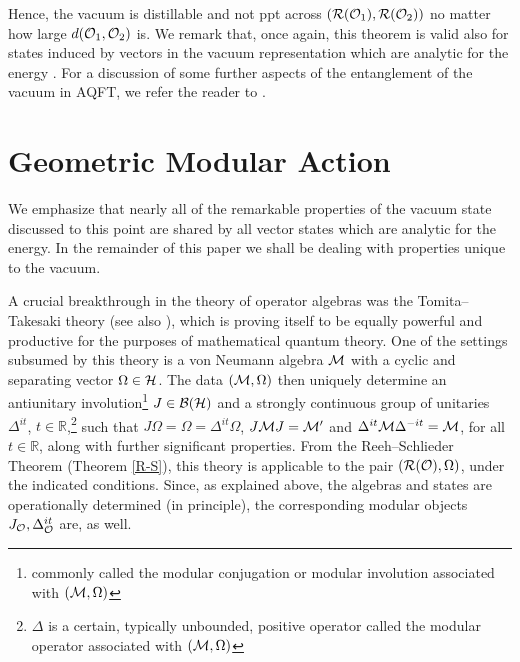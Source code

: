 \documentclass[12pt]{article}
\def\nind{\noindent}
\def\Bs{{\cal B}}
\def\Hs{{\cal H}}
\def\Ms{{\cal M}}
\def\Os{{\cal O}}
\def\Rs{{\cal R}}
\def\pairf{{(\Rs(\Os_1),\Rs(\Os_2))}}
\def\nind{\noindent}
\def\RR{{\mathbb R}}
\begin{document}
\nind Hence, the vacuum is distillable and not ppt across $\pairf$ no
matter how large $d(\Os_1,\Os_2)$ is. We remark that, once again, this
theorem is valid also for states induced by vectors in the vacuum 
representation which are analytic for the energy \cite{VeWe}. For a 
discussion of some further aspects of the entanglement of the vacuum in AQFT, 
we refer the reader to \cite{ClHa}. 


\section{Geometric Modular Action} \label{cgmasec}

     We emphasize that nearly all of the remarkable properties of the
vacuum state discussed to this point are shared by all vector states
which are analytic for the energy. In the remainder of this paper we shall
be dealing with properties unique to the vacuum.

     A crucial breakthrough in the theory of operator algebras was the
Tomita--Takesaki theory \cite{Takm} (see also \cite{KaRi2,Tak2}), which
is proving itself to be equally powerful and productive for the
purposes of mathematical quantum theory.
One of the settings subsumed by this theory is a von Neumann algebra
$\Ms$ with a cyclic and separating vector $\Omega \in \Hs$. The
data $(\Ms,\Omega)$ then uniquely determine an antiunitary 
involution\footnote{commonly called the modular conjugation or 
modular involution associated with $(\Ms,\Omega)$}
$J \in \Bs(\Hs)$ and a strongly continuous group of unitaries
$\Delta^{it}$, $t \in \RR$,\footnote{$\Delta$ is a certain, typically 
unbounded, positive operator called the modular operator associated 
with $(\Ms,\Omega)$} 
such that $J \Omega = \Omega = \Delta^{it} \Omega$, $J \Ms J = \Ms'$ and
$ \Delta^{it} \Ms \Delta^{-it} = \Ms$, for all $t \in \RR$,
along with further significant properties. From the Reeh--Schlieder
Theorem (Theorem \ref{R-S}), this theory is applicable to the pair
$(\Rs(\Os), \Omega)$, under the indicated conditions. Since, as explained
above, the algebras and states are operationally determined (in
principle), the corresponding modular objects $J_\Os, \Delta_\Os^{it}$
are, as well.
\end{document}
